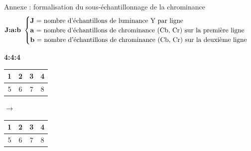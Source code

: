 \documentclass[xcolor=dvipsnames]{beamer}
\begin{document}
\begin{frame}{Annexe : formalisation du sous-échantillonnage de la chrominance}
    \scriptsize
    \vspace{-0.3cm}
    \[
        \textbf{J:a:b} \ 
        \begin{cases}
        \text{\textbf{J} = nombre d'échantillons de luminance Y par ligne} \\
        \text{\textbf{a} = nombre d'échantillons de chrominance (Cb, Cr) sur la première ligne} \\
        \text{\textbf{b} = nombre d'échantillons de chrominance (Cb, Cr) sur la deuxième ligne} \\        
        \end{cases}
    \]

    \vspace{0.3cm}

    \noindent
    \begin{minipage}[t]{0.25\textwidth}
        \centering
        \small
      \textbf{4:4:4}
    \end{minipage}
    \hfill
    \begin{minipage}[t]{0.7\textwidth}
      \begin{tabular}{|c|c|c|c|}
        \hline
        1 & 2 & 3 & 4 \\
        \hline
        5 & 6 & 7 & 8 \\
        \hline
      \end{tabular}
        $ \rightarrow $
      \begin{tabular}{|c|c|c|c|}
        \hline
        1 & 2 & 3 & 4 \\
        \hline
        5 & 6 & 7 & 8 \\
        \hline
      \end{tabular}
    \end{minipage}
    
    \vspace{.6cm} %
    

\end{frame}
\end{document}
